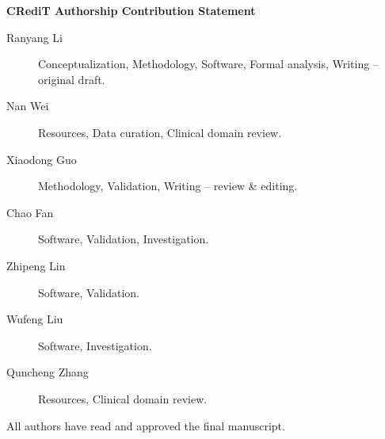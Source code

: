 \documentclass[11pt]{article}
\begin{document}
\begin{center}\textbf{CRediT Authorship Contribution Statement}\end{center}

\begin{description}
\item[Ranyang Li] Conceptualization, Methodology, Software, Formal analysis, Writing -- original draft.
\item[Nan Wei] Resources, Data curation, Clinical domain review.
\item[Xiaodong Guo] Methodology, Validation, Writing -- review \& editing.
\item[Chao Fan] Software, Validation, Investigation.
\item[Zhipeng Lin] Software, Validation.
\item[Wufeng Liu] Software, Investigation.
\item[Quncheng Zhang] Resources, Clinical domain review.
\end{description}

All authors have read and approved the final manuscript.
\end{document}
